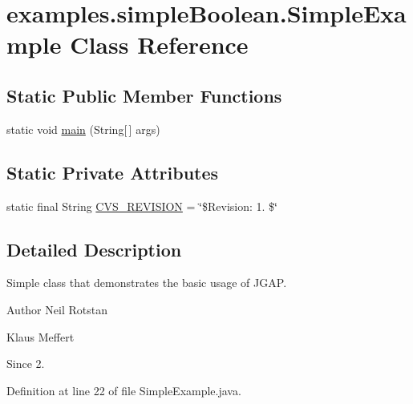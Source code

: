 \hypertarget{classexamples_1_1simple_boolean_1_1_simple_example}{\section{examples.\-simple\-Boolean.\-Simple\-Example Class Reference}
\label{classexamples_1_1simple_boolean_1_1_simple_example}
}
\subsection*{Static Public Member Functions}
\begin{DoxyCompactItemize}
\item 
static void \hyperlink{classexamples_1_1simple_boolean_1_1_simple_example_aea1aca5a08eada23f26be3ae3451c2fc}{main} (String\mbox{[}$\,$\mbox{]} args)
\end{DoxyCompactItemize}
\subsection*{Static Private Attributes}
\begin{DoxyCompactItemize}
\item 
static final String \hyperlink{classexamples_1_1simple_boolean_1_1_simple_example_ad6fd750ef219fca1eb0d41b8a35de248}{C\-V\-S\-\_\-\-R\-E\-V\-I\-S\-I\-O\-N} = \char`\"{}\$Revision\-: 1. \$\char`\"{}
\end{DoxyCompactItemize}


\subsection{Detailed Description}
Simple class that demonstrates the basic usage of J\-G\-A\-P.

\begin{DoxyAuthor}{Author}
Neil Rotstan 

Klaus Meffert 
\end{DoxyAuthor}
\begin{DoxySince}{Since}
2. 
\end{DoxySince}


Definition at line 22 of file Simple\-Example.\-java.



